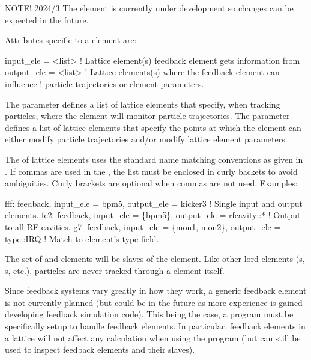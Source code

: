 NOTE! 2024/3 The  element is currently under development so changes can be expected in the future.

Attributes specific to a  element are:
\begin{example}
  input_ele  = <list>   ! Lattice element(s) feedback element gets information from
  output_ele = <list>   ! Lattice elements(s) where the feedback element can influence
                        !   particle trajectories or element parameters.
\end{example}

The  parameter defines a list of lattice elements that specify, when tracking particles,
where the  element will monitor particle trajectories. The  parameter
defines a list of lattice elements that specify the points at which the  element can
either modify particle trajectories and/or modify lattice element parameters.

The  of lattice elements uses the standard \bmad name matching conventions as given in
. If commas are used in the , the list must be enclosed in curly
backets  to avoid ambiguities. Curly brackets are optional when commas are not
used. Examples:
\begin{example}
  fff: feedback, input_ele = bpm5, 
                  output_ele = kicker3      ! Single input and output elements.
  fe2: feedback, input_ele = \{bpm5\}, 
                  output_ele = rfcavity::*  ! Output to all RF cavities.
  g7: feedback, input_ele = \{mon1, mon2\}, 
                  output_ele = type::IRQ    ! Match to element's type field.
\end{example}

The set of  and  elements will be  slaves of the
  element. Like other lord elements (s, s,
etc.), particles are never tracked through a  element itself.

Since feedback systems vary greatly in how they work, a generic feedback element is not currently
planned (but could be in the future as more experience is gained developing feedback simulation
code).  This being the case, a program must be specifically setup to handle feedback elements. In
particular, feedback elements in a lattice will not affect any calculation when using the 
program (but  can still be used to inspect feedback elements and their slaves).

